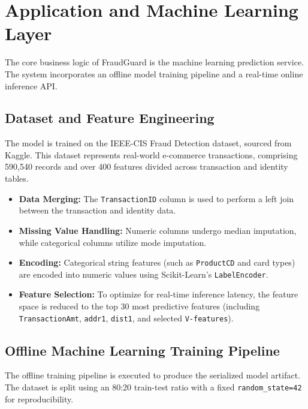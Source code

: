 \documentclass[12pt,a4paper]{article}
\begin{document}
\newpage

\section{Application and Machine Learning Layer}
The core business logic of FraudGuard is the machine learning prediction service. The system incorporates an offline model training pipeline and a real-time online inference API.

\subsection{Dataset and Feature Engineering}
The model is trained on the IEEE-CIS Fraud Detection dataset, sourced from Kaggle. This dataset represents real-world e-commerce transactions, comprising 590,540 records and over 400 features divided across transaction and identity tables.
\begin{itemize}
    \item \textbf{Data Merging:} The \texttt{TransactionID} column is used to perform a left join between the transaction and identity data.
    \item \textbf{Missing Value Handling:} Numeric columns undergo median imputation, while categorical columns utilize mode imputation.
    \item \textbf{Encoding:} Categorical string features (such as \texttt{ProductCD} and card types) are encoded into numeric values using Scikit-Learn's \texttt{LabelEncoder}.
    \item \textbf{Feature Selection:} To optimize for real-time inference latency, the feature space is reduced to the top 30 most predictive features (including \texttt{TransactionAmt}, \texttt{addr1}, \texttt{dist1}, and selected \texttt{V-features}).
\end{itemize}

\subsection{Offline Machine Learning Training Pipeline}
The offline training pipeline is executed to produce the serialized model artifact. The dataset is split using an 80:20 train-test ratio with a fixed \texttt{random\_state=42} for reproducibility.
\end{document}
